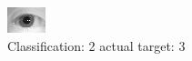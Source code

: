 \begin{figure}[h!]
\begin{center}
\includegraphics[width=0.60\columnwidth]{figures/ID1182_class_2_target_3.png}
\end{center}
\caption{ Classification: 2 actual target: 3}
\label{fig:ID1182_class_2_target_3}
\end{figure}

